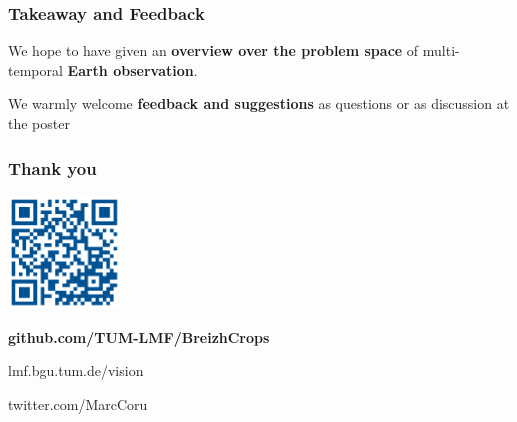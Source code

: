 \documentclass[%
  aspectratio=169,
  9pt,
  USenglish,
  titlegraphic, %
  affiliationintitlepagehead,
  affiliation,
]{beamer}
\begin{document}
\begin{frame}
	\frametitle{Takeaway and Feedback}
	
	\Large
	
	We hope to have given an \textbf{overview over the problem space} of multi-temporal \textbf{Earth observation}.
	
	\vspace{2em}
	
	We warmly welcome \textbf{feedback and suggestions} as questions or as discussion at the poster
	
	
\end{frame}

%
%	
%	
%	
%	

\begin{frame}
	\frametitle{Thank you}
	
	\centering
	\includegraphics[width=3cm]{images/qrcode}
	
	\Large\textbf{github.com/TUM-LMF/BreizhCrops}
	
	\Large
	lmf.bgu.tum.de/vision
	
	twitter.com/MarcCoru
\end{frame}
\end{document}
